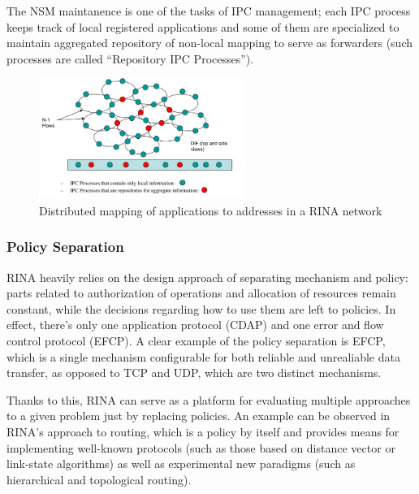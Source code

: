                 The NSM maintanence is one of the tasks of IPC management; each IPC process keeps track of local registered applications and some of them are specialized to maintain aggregated repository of non-local mapping to serve as forwarders (such processes are called ``Repository IPC Processes'').

                \begin{figure}[H]
                    \begin{center}
                        \includegraphics[width=0.6\textwidth]{fig/archs_rina-nsm.png}
                      \caption{Distributed mapping of applications to addresses in a RINA network}
                      \label{fig:rina_nsm}
                    \end{center}
                \end{figure}

            \subsubsection{Policy Separation}

                RINA heavily relies on the design approach of separating mechanism and policy: parts related to authorization of operations and allocation of resources remain constant, while the decisions regarding how to use them are left to policies. In effect, there's only one application protocol (CDAP) and one error and flow control protocol (EFCP). A clear example of the policy separation is EFCP, which is a single mechanism configurable for both reliable and unrealiable data transfer, as opposed to TCP and UDP, which are two distinct mechanisms.

                Thanks to this, RINA can serve as a platform for evaluating multiple approaches to a given problem just by replacing policies. An example can be observed in RINA's approach to routing, which is a policy by itself and provides means for implementing well-known protocols (such as those based on distance vector or link-state algorithms) as well as experimental new paradigms (such as hierarchical and topological routing).

